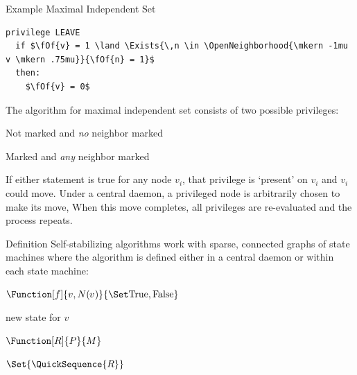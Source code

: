 \documentclass{beamer}
\begin{document}
\begin{frame}[fragile,t]
\begin{columns}[t]
\begin{column}{.45\textwidth}
\begin{block}{Example \Dash Maximal Independent Set}
\begin{minipage}[b]{9in}
\begin{lstlisting}[language=ssa,frame=lines]
privilege LEAVE
  if $\fOf{v} = 1 \land \Exists{\,n \in \OpenNeighborhood{\mkern -1mu v \mkern .75mu}}{\fOf{n} = 1}$
  then:
    $\fOf{v} = 0$
\end{lstlisting}
          \vspace{.5in}
          The algorithm for maximal independent set consists of two possible privileges:
          \bigskip
          \begin{description}
          \item[\texttt{ENTER}] Not marked and \emph{no} neighbor marked
          \item[\texttt{LEAVE}] Marked and \emph{any} neighbor marked
          \end{description}
          \bigskip
          If either statement is true for any node $v_i$,
            that privilege is `present' on $v_i$
            and $v_i$ could move.
          Under a central daemon,
            a privileged node is arbitrarily chosen to make its move,
          When this move completes,
            all privileges are re-evaluated
            and the process repeats.
          \vfill
          ~
        \end{minipage}
        \vspace*{-2ex}
      \end{block}

      \begin{block}{Definition}
        Self-stabilizing algorithms work with sparse, connected graphs of state machines where
          the algorithm is defined either in a central daemon or within each state machine:
        \begin{description}[algorithmMMMM]
        \item[predicate] $\Function[f]{v, N(\mkern -1mu v\mkern .75mu)}{\SetBoolean}$
        \item[move] new state for $v$
        \item[rule] $\Function[R]{P}{M}$
        \item[algorithm] $\Set{\QuickSequence{R}}$
        \end{description}
        \begin{center}
\end{center}
\end{block}
\end{column}
\end{columns}
\end{frame}
\end{document}
